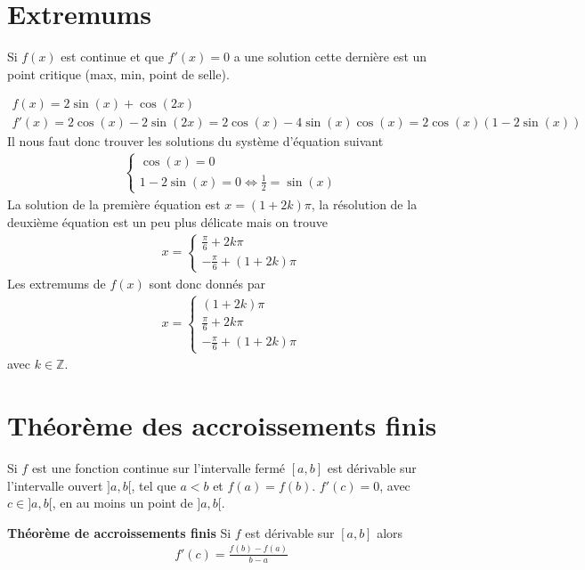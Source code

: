 \section{Extremums}
Si $f(x)$ est continue et que $f'(x)=0$ a une solution cette dernière est un point critique (max, min, point de selle).

\begin{myExample}
	\begin{eqnarray*}
		f(x)=2\sin{(x)}+\cos{(2x)}
		\\
		f'(x)=2\cos{(x)}-2\sin{(2x)}=2\cos{(x)}-4\sin{(x)}\cos{(x)}=2\cos{(x)}(1-2\sin{(x)})
	\end{eqnarray*}
	Il nous faut donc trouver les solutions du système d'équation suivant
	\begin{eqnarray*}
		\begin{cases}
			\cos{(x)}=0
			\\
			1-2\sin{(x)}=0 \Leftrightarrow \frac{1}{2}=\sin{(x)}
		\end{cases}	
	\end{eqnarray*}
	La solution de la première équation est $x=(1+2k)\pi$, la résolution de la deuxième équation est un peu plus délicate mais on trouve
	\begin{eqnarray*}
		x=\begin{cases}
			\frac{\pi}{6}+2k\pi
			\\
			-\frac{\pi}{6}+(1+2k)\pi
		\end{cases}
	\end{eqnarray*}
	Les extremums de $f(x)$ sont donc donnés par
	\begin{eqnarray*}
		x=\begin{cases}
			(1+2k)\pi
			\\
			\frac{\pi}{6}+2k\pi
			\\
			-\frac{\pi}{6}+(1+2k)\pi
		\end{cases}
	\end{eqnarray*}
	avec $k\in\mathbb Z$.
\end{myExample} 

\section{Théorème des accroissements finis}
Si $f$ est une fonction continue sur l'intervalle fermé $[a,b]$ est dérivable sur l'intervalle ouvert $]a,b[$, tel que $a<b$ et $f(a)=f(b)$. $f'(c)=0$, avec $c\in]a,b[$, en au moins un point de $]a,b[$.

\begin{myTheorem}\textbf{Théorème de accroissements finis}
	Si $f$ est dérivable sur $[a,b]$ alors \begin{eqnarray}
		f'(c)=\frac{f(b)-f(a)}{b-a}
	\end{eqnarray} 
\end{myTheorem}

